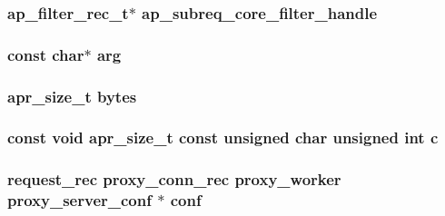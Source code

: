 \subsubsection[{\texorpdfstring{ap\+\_\+subreq\+\_\+core\+\_\+filter\+\_\+handle}{ap_subreq_core_filter_handle}}]{ {\bf ap\+\_\+filter\+\_\+rec\+\_\+t}$\ast$ ap\+\_\+subreq\+\_\+core\+\_\+filter\+\_\+handle}\hypertarget{group__APACHE__CORE__HTTPD_ga3845515345618ae5adba5cf543a6ca60}{}\label{group__APACHE__CORE__HTTPD_ga3845515345618ae5adba5cf543a6ca60}
\subsubsection[{\texorpdfstring{arg}{arg}}]{ const char$\ast$ arg}\hypertarget{group__APACHE__CORE__HTTPD_gaf6517210150d97cd5cb8a17e3768770d}{}\label{group__APACHE__CORE__HTTPD_gaf6517210150d97cd5cb8a17e3768770d}
\subsubsection[{\texorpdfstring{bytes}{bytes}}]{ {\bf apr\+\_\+size\+\_\+t} bytes}\hypertarget{group__APACHE__CORE__HTTPD_ga393b167dab644f408202cbbcad070e6d}{}\label{group__APACHE__CORE__HTTPD_ga393b167dab644f408202cbbcad070e6d}
\subsubsection[{\texorpdfstring{c}{c}}]{\setlength{\rightskip}{0pt plus 5cm}const {\bf void} {\bf apr\+\_\+size\+\_\+t} const unsigned char unsigned {\bf int} c}\hypertarget{group__APACHE__CORE__HTTPD_ga7cce37ef8558e46f408cb4d0f555605b}{}\label{group__APACHE__CORE__HTTPD_ga7cce37ef8558e46f408cb4d0f555605b}
\subsubsection[{\texorpdfstring{conf}{conf}}]{ {\bf request\+\_\+rec} {\bf proxy\+\_\+conn\+\_\+rec} {\bf proxy\+\_\+worker} {\bf proxy\+\_\+server\+\_\+conf} $\ast$ conf}\hypertarget{group__APACHE__CORE__HTTPD_ga7be6dfd9155648f64d6e9abcd78c38cd}{}\label{group__APACHE__CORE__HTTPD_ga7be6dfd9155648f64d6e9abcd78c38cd}
